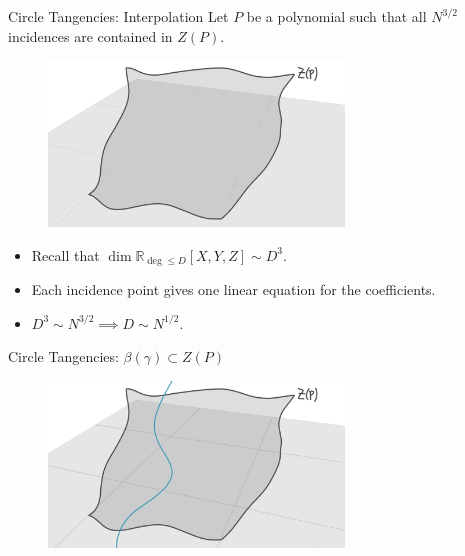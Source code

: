 \documentclass{beamer}
\newcommand{\RR}{\mathbb R}
\newcommand{\nfr}[1]{\begin{frame} #1
\end{frame}}
\begin{document}
\nfr{{Circle Tangencies: Interpolation}
Let $P$ be a polynomial such that all $N^{3/2}$ incidences are contained in $Z(P)$. 

\begin{figure}[h]
    \centering
    \includegraphics[width=0.7\textwidth]{images/lots_of_dots_d.png}
\end{figure}
\pause
\begin{itemize}
    \item Recall that $\dim \RR_{\deg \leq D} [X,Y,Z] \sim D^3$. \pause
    \item Each incidence point gives one linear equation for the coefficients. \pause
    \item $D^3 \sim N^{3/2} \implies D \sim N^{1/2}$.
\end{itemize}

}

\nfr{{Circle Tangencies: $\beta(\gamma) \subset Z(P)$}
\begin{figure}[h]
    \centering
    \includegraphics[width=0.7\textwidth]{images/lots_of_dots_e.png}
\end{figure}
}
\end{document}
